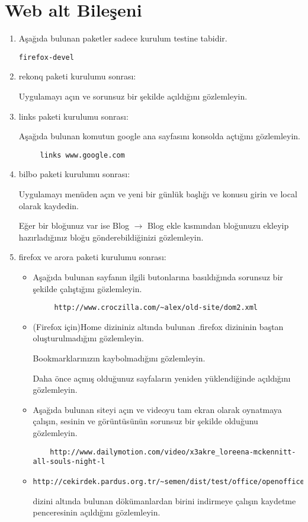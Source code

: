\documentclass[a4paper,10pt]{article}
\begin{document}
\section{Web alt Bileşeni}
\begin{enumerate}
\item Aşağıda bulunan paketler sadece kurulum testine tabidir.
\begin{verbatim}
firefox-devel 
\end{verbatim}

\item rekonq paketi kurulumu sonrası:

Uygulamayı açın ve sorunsuz bir şekilde açıldığını gözlemleyin.

\item links paketi kurulumu sonrası:

  Aşağıda bulunan komutun google ana sayfasını konsolda açtığını gözlemleyin.
	\begin{verbatim}
	 links www.google.com
	\end{verbatim}

\item bilbo paketi kurulumu sonrası:

Uygulamayı menüden açın ve yeni bir günlük başlığı ve konusu girin ve local olarak kaydedin. 

Eğer bir bloğunuz var ise Blog $\rightarrow$ Blog ekle kısmından bloğunuzu ekleyip hazırladığınız bloğu gönderebildiğinizi gözlemleyin.
\item firefox ve arora paketi kurulumu sonrası:
\begin{itemize}
 \item Aşağıda bulunan sayfanın ilgili butonlarına basıldığında sorunsuz bir şekilde çalıştığını gözlemleyin.
	\begin{verbatim}
	 http://www.croczilla.com/~alex/old-site/dom2.xml
	\end{verbatim}
 \item (Firefox için)Home dizininiz altında bulunan .firefox dizininin baştan oluşturulmadığını gözlemleyin.
	
	Bookmarklarınızın kaybolmadığını gözlemleyin.
	
 	Daha önce açmış olduğunuz sayfaların yeniden yüklendiğinde açıldığını gözlemleyin.

\item Aşağıda bulunan siteyi açın ve videoyu tam ekran olarak oynatmaya çalışın, sesinin ve görüntüsünün sorunsuz bir şekilde olduğunu gözlemleyin.
	\begin{verbatim}
	http://www.dailymotion.com/video/x3akre_loreena-mckennitt-all-souls-night-l 
	\end{verbatim}
\item \begin{verbatim}http://cekirdek.pardus.org.tr/~semen/dist/test/office/openoffice/\end{verbatim} dizini altında bulunan dökümanlardan birini indirmeye çalışın kaydetme penceresinin açıldığını gözlemleyin.


\end{itemize}
\end{enumerate}
\end{document}
